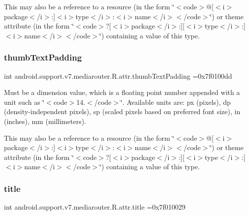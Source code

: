 This may also be a reference to a resource (in the form \char`\"{}$<$code$>$@\mbox{[}$<$i$>$package$<$/i$>$\+:\mbox{]}$<$i$>$type$<$/i$>$\+:$<$i$>$name$<$/i$>$$<$/code$>$\char`\"{}) or theme attribute (in the form \char`\"{}$<$code$>$?\mbox{[}$<$i$>$package$<$/i$>$\+:\mbox{]}\mbox{[}$<$i$>$type$<$/i$>$\+:\mbox{]}$<$i$>$name$<$/i$>$$<$/code$>$\char`\"{}) containing a value of this type. \mbox{\label{classandroid_1_1support_1_1v7_1_1mediarouter_1_1R_1_1attr_a7468fae21c1543c65b63c2dc30a2d332}} 
\subsubsection{\texorpdfstring{thumb\+Text\+Padding}{thumbTextPadding}}
{\footnotesize\ttfamily int android.\+support.\+v7.\+mediarouter.\+R.\+attr.\+thumb\+Text\+Padding =0x7f0100dd\hspace{0.3cm}{\ttfamily [static]}}

Must be a dimension value, which is a floating point number appended with a unit such as \char`\"{}$<$code$>$14.\+5sp$<$/code$>$\char`\"{}. Available units are\+: px (pixels), dp (density-\/independent pixels), sp (scaled pixels based on preferred font size), in (inches), mm (millimeters). 

This may also be a reference to a resource (in the form \char`\"{}$<$code$>$@\mbox{[}$<$i$>$package$<$/i$>$\+:\mbox{]}$<$i$>$type$<$/i$>$\+:$<$i$>$name$<$/i$>$$<$/code$>$\char`\"{}) or theme attribute (in the form \char`\"{}$<$code$>$?\mbox{[}$<$i$>$package$<$/i$>$\+:\mbox{]}\mbox{[}$<$i$>$type$<$/i$>$\+:\mbox{]}$<$i$>$name$<$/i$>$$<$/code$>$\char`\"{}) containing a value of this type. \mbox{\label{classandroid_1_1support_1_1v7_1_1mediarouter_1_1R_1_1attr_a63e7cf1dd1a79d708a4d99098363d8bd}} 
\subsubsection{\texorpdfstring{title}{title}}
{\footnotesize\ttfamily int android.\+support.\+v7.\+mediarouter.\+R.\+attr.\+title =0x7f010029\hspace{0.3cm}{\ttfamily [static]}}

